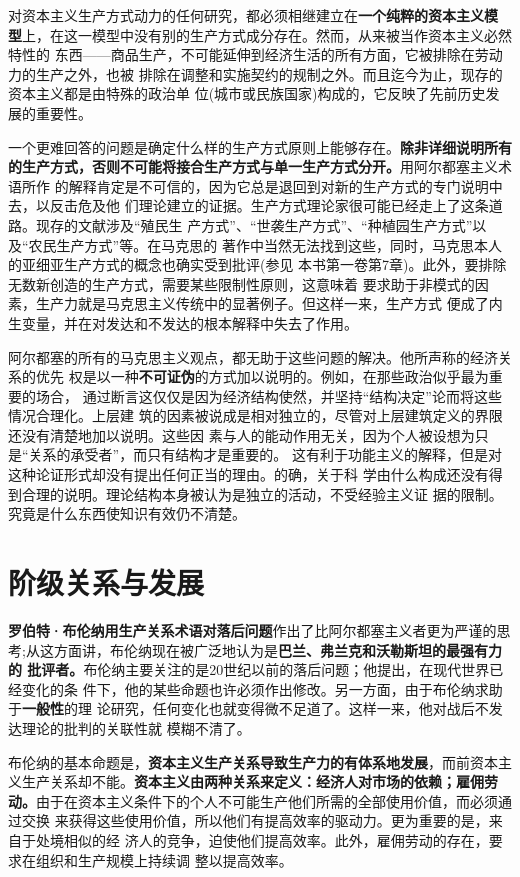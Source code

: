 对资本主义生产方式动力的任何研究，都必须相继建立在\textbf{一个纯粹的资本主义模
  型}上，在这一模型中没有别的生产方式成分存在。然而，从来被当作资本主义必然特性的
东西——商品生产，不可能延伸到经济生活的所有方面，它被排除在劳动力的生产之外，也被
排除在调整和实施契约的规制之外。而且迄今为止，现存的资本主义都是由特殊的政治单
位(城市或民族国家)构成的，它反映了先前历史发展的重要性。

一个更难回答的问题是确定什么样的生产方式原则上能够存在。\textbf{除非详细说明所有
  的生产方式，否则不可能将接合生产方式与单一生产方式分开。}用阿尔都塞主义术语所作
的解释肯定是不可信的，因为它总是退回到对新的生产方式的专门说明中去，以反击危及他
们理论建立的证据。生产方式理论家很可能已经走上了这条道路。现存的文献涉及“殖民生
产方式”、“世袭生产方式”、“种植园生产方式”以及“农民生产方式”等。在马克思的
著作中当然无法找到这些，同时，马克思本人的亚细亚生产方式的概念也确实受到批评(参见
本书第一卷第7章)。此外，要排除无数新创造的生产方式，需要某些限制性原则，这意味着
要求助于非模式的因素，生产力就是马克思主义传统中的显著例子。但这样一来，生产方式
便成了内生变量，并在对发达和不发达的根本解释中失去了作用。

阿尔都塞的所有的马克思主义观点，都无助于这些问题的解决。他所声称的经济关系的优先
权是以一种\textbf{不可证伪}的方式加以说明的。例如，在那些政治似乎最为重要的场合，
通过断言这仅仅是因为经济结构使然，并坚持“结构决定”论而将这些情况合理化。上层建
筑的因素被说成是相对独立的，尽管对上层建筑定义的界限还没有清楚地加以说明。这些因
素与人的能动作用无关，因为个人被设想为只是“关系的承受者”，而只有结构才是重要的。
这有利于功能主义的解释，但是对这种论证形式却没有提出任何正当的理由。的确，关于科
学由什么构成还没有得到合理的说明。理论结构本身被认为是独立的活动，不受经验主义证
据的限制。究竟是什么东西使知识有效仍不清楚。

\section{阶级关系与发展}

\textbf{罗伯特·布伦纳用生产关系术语对落后问题}作出了比阿尔都塞主义者更为严谨的思
考;从这方面讲，布伦纳现在被广泛地认为是\textbf{巴兰、弗兰克和沃勒斯坦的最强有力的
  批评者。}布伦纳主要关注的是20世纪以前的落后问题；他提出，在现代世界已经变化的条
件下，他的某些命题也许必须作出修改。另一方面，由于布伦纳求助于\textbf{一般性}的理
论研究，任何变化也就变得微不足道了。这样一来，他对战后不发达理论的批判的关联性就
模糊不清了。

布伦纳的基本命题是，\textbf{资本主义生产关系导致生产力的有体系地发展}，而前资本主
义生产关系却不能。\textbf{资本主义由两种关系来定义：经济人对市场的依赖；雇佣劳
  动。}由于在资本主义条件下的个人不可能生产他们所需的全部使用价值，而必须通过交换
来获得这些使用价值，所以他们有提高效率的驱动力。更为重要的是，来自于处境相似的经
济人的竞争，迫使他们提高效率。此外，雇佣劳动的存在，要求在组织和生产规模上持续调
整以提高效率。

